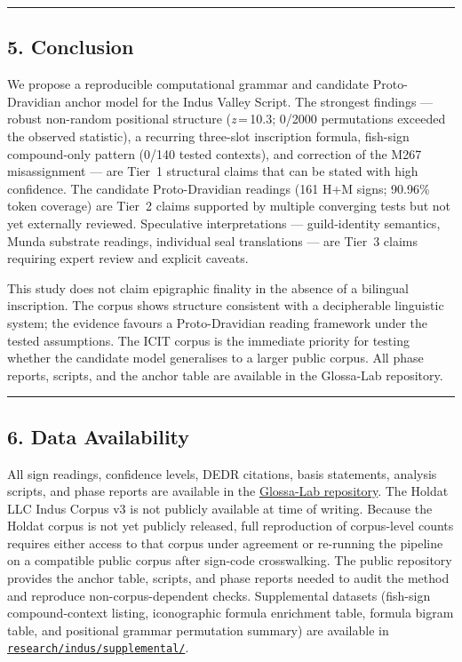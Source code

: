 \documentclass[
]{article}
\begin{document}
\begin{center}\rule{0.5\linewidth}{0.5pt}\end{center}

\subsection{5. Conclusion}\label{conclusion}

We propose a reproducible computational grammar and candidate
Proto-Dravidian anchor model for the Indus Valley Script. The
strongest findings --- robust non-random positional structure
(\textit{z}\,=\,10.3; 0/2000 permutations exceeded the observed statistic), a recurring three-slot inscription formula,
fish-sign compound-only pattern (0/140 tested contexts), and correction
of the M267 misassignment --- are Tier~1 structural claims that can be
stated with high confidence. The candidate Proto-Dravidian readings
(161 H+M signs; 90.96\% token coverage) are Tier~2 claims supported by
multiple converging tests but not yet externally reviewed. Speculative
interpretations --- guild-identity semantics, Munda substrate readings,
individual seal translations --- are Tier~3 claims requiring expert
review and explicit caveats.

This study does not claim epigraphic finality in the absence of a
bilingual inscription. The corpus shows structure consistent with a
decipherable linguistic system; the evidence favours a Proto-Dravidian
reading framework under the tested assumptions. The ICIT corpus
is the immediate
priority for testing whether the candidate model generalises to a larger public corpus. All phase
reports, scripts, and the anchor table are available in the Glossa-Lab repository.

\begin{center}\rule{0.5\linewidth}{0.5pt}\end{center}

\subsection{6. Data Availability}\label{data-availability}

All sign readings, confidence levels, DEDR citations, basis statements, analysis scripts, and phase reports are available in the \href{https://github.com/BitConcepts/glossa-lab}{Glossa-Lab repository}. The Holdat LLC Indus Corpus v3 is not publicly available at time of writing. Because the Holdat corpus is not yet publicly released, full reproduction of corpus-level counts requires either access to that corpus under agreement or re-running the pipeline on a compatible public corpus after sign-code crosswalking. The public repository provides the anchor table, scripts, and phase reports needed to audit the method and reproduce non-corpus-dependent checks. Supplemental datasets (fish-sign compound-context listing, iconographic formula enrichment table, formula bigram table, and positional grammar permutation summary) are available in \href{https://github.com/BitConcepts/glossa-lab/tree/main/research/indus/supplemental}{\texttt{research/indus/supplemental/}}.
\end{document}
